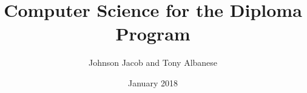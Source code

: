\documentclass[a4paper,12pt]{book}
\begin{document}
\author{Johnson Jacob and Tony Albanese}
\title{Computer Science for the Diploma Program}
\date{January 2018}

\maketitle





\end{document}
